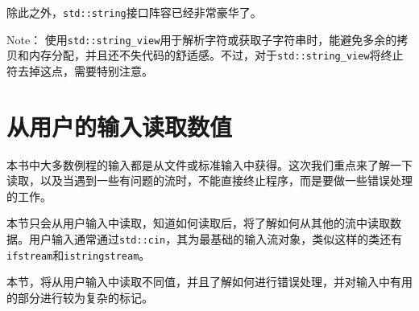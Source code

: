 除此之外，\texttt{std::string}接口阵容已经非常豪华了。

\begin{myInfoBox}
Note： 使用\texttt{std::string\_view}用于解析字符或获取子字符串时，能避免多余的拷贝和内存分配，并且还不失代码的舒适感。不过，对于\texttt{std::string\_view}将终止符去掉这点，需要特别注意。
\end{myInfoBox}


\section{从用户的输入读取数值}

本书中大多数例程的输入都是从文件或标准输入中获得。这次我们重点来了解一下读取，以及当遇到一些有问题的流时，不能直接终止程序，而是要做一些错误处理的工作。

本节只会从用户输入中读取，知道如何读取后，将了解如何从其他的流中读取数据。用户输入通常通过\texttt{std::cin}，其为最基础的输入流对象，类似这样的类还有\texttt{ifstream}和\texttt{istringstream}。


本节，将从用户输入中读取不同值，并且了解如何进行错误处理，并对输入中有用的部分进行较为复杂的标记。

